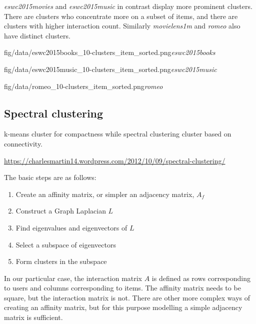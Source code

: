 \textit{eswc2015movies} and \textit{eswc2015music} in contrast display more prominent clusters. There are clusters who concentrate more on a subset of items, and there are clusters with higher interaction count.  Similarly \textit{movielens1m} and \textit{romeo} also have distinct clusters.



\FloatBarrier

{fig/data/eswc2015books_10-clusters_item_sorted.png}{\textit{eswc2015books}}

{fig/data/eswc2015music_10-clusters_item_sorted.png}{\textit{eswc2015music}}

{fig/data/romeo_10-clusters_item_sorted.png}{\textit{romeo}}

\FloatBarrier

\newpage

\subsection{Spectral clustering}

k-means cluster for compactness while spectral clustering cluster based on connectivity.

\url{https://charlesmartin14.wordpress.com/2012/10/09/spectral-clustering/}

The basic steps are as follows:

\begin{enumerate}
    \item Create an affinity matrix, or simpler an adjacency matrix, $A_{f}$
    \item Construct a Graph Laplacian $L$
    \item Find eigenvalues and eigenvectors of $L$
    \item Select a subspace of eigenvectors
    \item Form clusters in the subspace
\end{enumerate}

In our particular case, the interaction matrix $A$ is defined as rows corresponding to users and columns corresponding to items. The affinity matrix needs to be square, but the interaction matrix is not. There are other more complex ways of creating an affinity matrix, but for this purpose modelling a simple adjacency matrix is sufficient.

